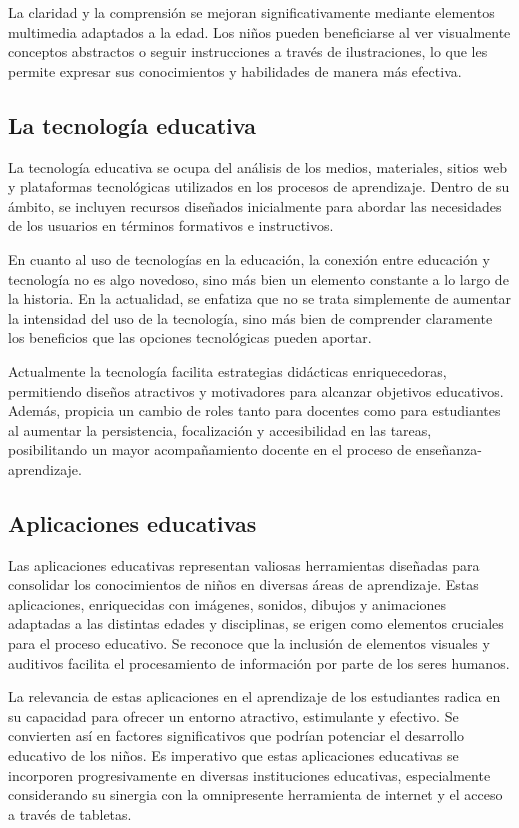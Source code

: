 La claridad y la comprensión se mejoran significativamente mediante elementos multimedia adaptados a la edad. Los niños pueden beneficiarse al ver visualmente conceptos abstractos o seguir instrucciones a través de ilustraciones, lo que les permite expresar sus conocimientos y habilidades de manera más efectiva.

\subsection{La tecnología educativa}

La tecnología educativa se ocupa del análisis de los medios, materiales, sitios web y plataformas tecnológicas utilizados en los procesos de aprendizaje. Dentro de su ámbito, se incluyen recursos diseñados inicialmente para abordar las necesidades de los usuarios en términos formativos e instructivos.

En cuanto al uso de tecnologías en la educación, la conexión entre educación y tecnología no es algo novedoso, sino más bien un elemento constante a lo largo de la historia. En la actualidad, se enfatiza que no se trata simplemente de aumentar la intensidad del uso de la tecnología, sino más bien de comprender claramente los beneficios que las opciones tecnológicas pueden aportar.

Actualmente la tecnología facilita estrategias didácticas enriquecedoras, permitiendo diseños atractivos y motivadores para alcanzar objetivos educativos. Además, propicia un cambio de roles tanto para docentes como para estudiantes al aumentar la persistencia, focalización y accesibilidad en las tareas, posibilitando un mayor acompañamiento docente en el proceso de enseñanza-aprendizaje.

\subsection{Aplicaciones educativas}

Las aplicaciones educativas representan valiosas herramientas diseñadas para consolidar los conocimientos de niños en diversas áreas de aprendizaje. Estas aplicaciones, enriquecidas con imágenes, sonidos, dibujos y animaciones adaptadas a las distintas edades y disciplinas, se erigen como elementos cruciales para el proceso educativo. Se reconoce que la inclusión de elementos visuales y auditivos facilita el procesamiento de información por parte de los seres humanos.

La relevancia de estas aplicaciones en el aprendizaje de los estudiantes radica en su capacidad para ofrecer un entorno atractivo, estimulante y efectivo. Se convierten así en factores significativos que podrían potenciar el desarrollo educativo de los niños. Es imperativo que estas aplicaciones educativas se incorporen progresivamente en diversas instituciones educativas, especialmente considerando su sinergia con la omnipresente herramienta de internet y el acceso a través de tabletas.

